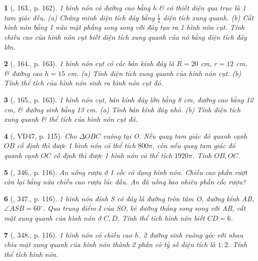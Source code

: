 \documentclass{article}
\newtheorem{baitoan}{}
\begin{document}
\begin{baitoan}[\cite{Tuyen_Toan_9_old}, 163., p. 162]
	1 hình nón có đường cao bằng h \& có thiết diện qua trục là 1 tam giác đều. (a) Chứng minh diện tích đáy bằng $\frac{1}{2}$ diện tích xung quanh. (b) Cắt hình nón bằng 1 nửa mặt phẳng song song với đáy tạo ra 1 hình nón cụt. Tính chiều cao của hình nón cụt biết diện tích xung quanh của nó bằng diện tích đáy lớn.
\end{baitoan}

\begin{baitoan}[\cite{Tuyen_Toan_9_old}, 164., p. 163]
	1 hình nón cụt có các bán kính đáy là $R = 20$ {\rm cm}, $r = 12$ {\rm cm}, \& đường cao $h = 15$ {\rm cm}. (a) Tính diện tích xung quanh của hình nón cụt. (b) Tính thể tích của hình nón sinh ra hình nón cụt đó.
\end{baitoan}

\begin{baitoan}[\cite{Tuyen_Toan_9_old}, 165., p. 163]
	1 hình nón cụt, bán kính đáy lớn bằng {\rm8 cm}, đường cao bằng {\rm12 cm}, \& đường sinh bằng {\rm13 cm}. (a) Tính bán kính đáy nhỏ. (b) Tính diện tích xung quanh \& thể tích của hình nón cụt đó.
\end{baitoan}

\begin{baitoan}[\cite{Binh_Toan_9_tap_2}, VD47, p. 115]
	Cho $\Delta OBC$ vuông tại O. Nếu quay tam giác đó quanh cạnh $OB$ cố định thì được 1 hình nón có thể tích $800\pi$, còn nếu quay tam giác đó quanh cạnh $OC$ cố định thì được 1 hình nón có thể tích $1920\pi$. Tính $OB,OC$.
\end{baitoan}

\begin{baitoan}[\cite{Binh_Toan_9_tap_2}, 346., p. 116]
	An uống rượu ở 1 cốc có dạng hình nón. Chiều cao phần rượt còn lại bằng nửa chiều cao rượu lúc đầu. An đã uống bao nhiêu phần cốc rượu?
\end{baitoan}

\begin{baitoan}[\cite{Binh_Toan_9_tap_2}, 347., p. 116]
	1 hình nón đỉnh S có đáy là đường tròn tâm O, đường kính AB, $\angle ASB = 60^\circ$. Qua trung điểm I của SO, kẻ đường thẳng song song với AB, cắt mặt xung quanh của hình nón ở $C,D$. Tính thể tích hình nón biết $CD = 6$.
\end{baitoan}

\begin{baitoan}[\cite{Binh_Toan_9_tap_2}, 348., p. 116]
	1 hình nón có chiều cao $h$. 2 đường sinh vuông góc với nhau chia mặt xung quanh của hình nón thành 2 phần có tỷ số diện tích là $1:2$. Tính thể tích hình nón.
\end{baitoan}
\end{document}

